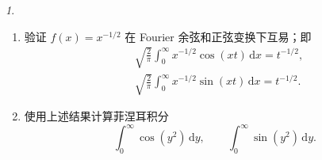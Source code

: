\documentclass[11pt]{article}
\theoremstyle{remark}
\newtheorem{problem}{}
\theoremstyle{definition}
\begin{document}
\begin{problem}
  \begin{enumerate}
    \item 验证 $f(x)=x^{-1/2}$ 在 Fourier 余弦和正弦变换下互易；即
    \[
    \begin{aligned}
    &\sqrt{\frac{2}{\pi}}
      \int_0^{\infty}x^{-1/2}\cos(xt)\,\mathrm{d}x
      =t^{-1/2},\\
    &\sqrt{\frac{2}{\pi}}
      \int_0^{\infty}x^{-1/2}\sin(xt)\,\mathrm{d}x
      =t^{-1/2}.
    \end{aligned}
    \]
    \item 使用上述结果计算菲涅耳积分
    \[
    \int_0^{\infty}\cos(y^2)\,\mathrm{d}y,\qquad
    \int_0^{\infty}\sin(y^2)\,\mathrm{d}y.
    \]
  \end{enumerate}
\end{problem}
\end{document}
